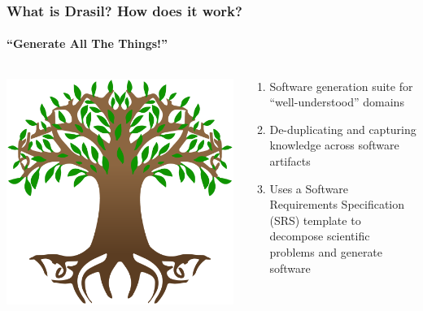 \documentclass[xcolor={dvipsnames}]{beamer}
\begin{document}
\begin{frame}
  \frametitle{What is Drasil? How does it work?}
  \framesubtitle{\textquotedblleft{}Generate All The Things!\textquotedblright{}}

  \begin{columns}
    \begin{column}{0.45\textwidth}
      \includegraphics[width=\textwidth]{drasil_logo.png}
    \end{column}
    \hfill
    \begin{column}{0.45\textwidth}
      \begin{enumerate}
        \item Software generation suite for ``well-understood'' domains
        \item De-duplicating and capturing knowledge across software artifacts
        \item Uses a Software Requirements Specification (SRS) template to
              decompose scientific problems and generate software
      \end{enumerate}
    \end{column}
  \end{columns}

\end{frame}
\end{document}
